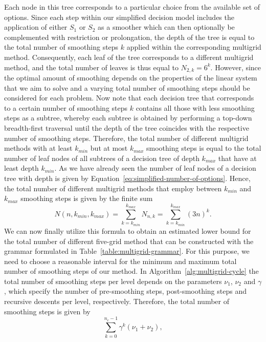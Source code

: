 Each node in this tree corresponds to a particular choice from the available set of options.
Since each step within our simplified decision model includes the application of either $S_1$ or $S_2$ as a smoother which can then optionally be complemented with restriction or prolongation, the depth of the tree is equal to the total number of smoothing steps $k$ applied within the corresponding multigrid method.
Consequently, each leaf of the tree corresponds to a different multigrid method, and the total number of leaves is thus equal to $N_{2,k} = 6^k$.
However, since the optimal amount of smoothing depends on the properties of the linear system that we aim to solve and a varying total number of smoothing steps should be considered for each problem.
Now note that each decision tree that corresponds to a certain number of smoothing steps $k$ contains all those with less smoothing steps as a subtree, whereby each subtree is obtained by performing a top-down breadth-first traversal until the depth of the tree coincides with the respective number of smoothing steps.
Therefore, the total number of different multigrid methods with at least $k_{min}$ but at most $k_{max}$ smoothing steps is equal to the total number of leaf nodes of all subtrees of a decision tree of depth $k_{max}$ that have at least depth $k_{min}$.
As we have already seen the number of leaf nodes of a decision tree with depth is given by Equation~\ref{eq:simplified-number-of-options}.
Hence, the total number of different multigrid methods that employ between $k_{min}$ and $k_{max}$ smoothing steps is given by the finite sum
\begin{equation}
	N(n, k_{min}, k_{max}) = \sum_{k = k_{min}}^{k_{max}} N_{n,k} = \sum_{k = k_{min}}^{k_{max}} (3 n)^k.
	\label{eq:search-space-estimation}
\end{equation}
We can now finally utilize this formula to obtain an estimated lower bound for the total number of different five-grid method that can be constructed with the grammar formulated in Table~\ref{table:multigrid-grammar}.
For this purpose, we need to choose a reasonable interval for the minimum and maximum total number of smoothing steps of our method.
In Algorithm~\ref{alg:multigrid-cycle} the total number of smoothing steps per level depends on the parameters $\nu_1$, $\nu_2$ and $\gamma$, which specify the number of pre-smoothing steps, post-smoothing steps and recursive descents per level, respectively.
Therefore, the total number of smoothing steps is given by
\begin{equation*}
	\sum_{k = 0}^{n_c - 1} \gamma^k (\nu_1 + \nu_2),
\end{equation*}
